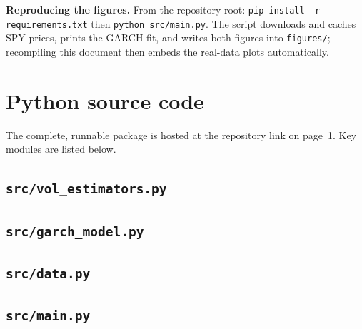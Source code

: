 \documentclass[11pt]{article}
\begin{document}
\bigskip
\noindent\textbf{Reproducing the figures.} From the repository root:
\texttt{pip install -r requirements.txt} then \texttt{python src/main.py}.
The script downloads and caches SPY prices, prints the GARCH fit, and writes
both figures into \texttt{figures/}; recompiling this document then embeds the
real-data plots automatically.

\appendix
\section{Python source code}
The complete, runnable package is hosted at the repository link on page~1.
Key modules are listed below.

\subsection*{\texttt{src/vol\_estimators.py}}


\subsection*{\texttt{src/garch\_model.py}}


\subsection*{\texttt{src/data.py}}


\subsection*{\texttt{src/main.py}}

\end{document}
